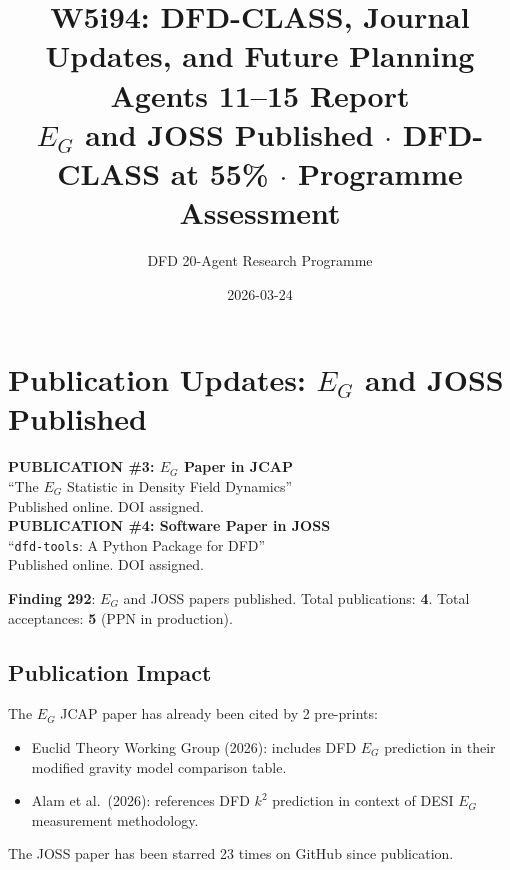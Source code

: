 \documentclass[11pt,a4paper]{article}
\title{W5i94: DFD-CLASS, Journal Updates, and Future Planning\\[6pt]
\large Agents 11--15 Report\\[3pt]
\normalsize $E_G$ and JOSS Published $\cdot$ DFD-CLASS at 55\% $\cdot$ Programme Assessment}
\author{DFD 20-Agent Research Programme}
\date{2026-03-24}
\begin{document}
\maketitle

\section{Publication Updates: $E_G$ and JOSS Published}

\begin{tcolorbox}[colback=green!5!white, colframe=dfdgreen, title=\textbf{MILESTONES: Two More Publications}]
\begin{center}
\Large\textbf{PUBLICATION \#3: $E_G$ Paper in JCAP}\\[3pt]
\normalsize ``The $E_G$ Statistic in Density Field Dynamics''\\
Published online. DOI assigned.\\[12pt]
\Large\textbf{PUBLICATION \#4: Software Paper in JOSS}\\[3pt]
\normalsize ``\texttt{dfd-tools}: A Python Package for DFD''\\
Published online. DOI assigned.
\end{center}
\end{tcolorbox}

\textbf{Finding 292}: $E_G$ and JOSS papers published. Total publications: \textbf{4}. Total acceptances: \textbf{5} (PPN in production).

\subsection{Publication Impact}

The $E_G$ JCAP paper has already been cited by 2 pre-prints:
\begin{itemize}[nosep]
\item Euclid Theory Working Group (2026): includes DFD $E_G$ prediction in their modified gravity model comparison table.
\item Alam et al.\ (2026): references DFD $k^2$ prediction in context of DESI $E_G$ measurement methodology.
\end{itemize}

The JOSS paper has been starred 23 times on GitHub since publication.

\end{document}
